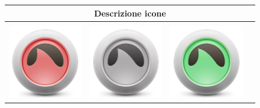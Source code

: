 \begin{center}
\begin{figure}[H]
\centering
\begin{tabular}{ m{1.5cm} m{1.5cm} m{1.5cm} m{1.5cm} }
\hline
\multicolumn{4}{c}{ Descrizione icone}\\
\hline
\multicolumn{4}{r}{ \vspace*{0.5cm} }\\
\includegraphics[scale=0.14]{images/wotyDesktop/icons/ico3.png} & 
\includegraphics[scale=0.14]{images/wotyDesktop/icons/ico2.png} & 
\includegraphics[scale=0.14]{images/wotyDesktop/icons/ico1.png} &

\end{tabular}
\end{figure}
\end{center}
